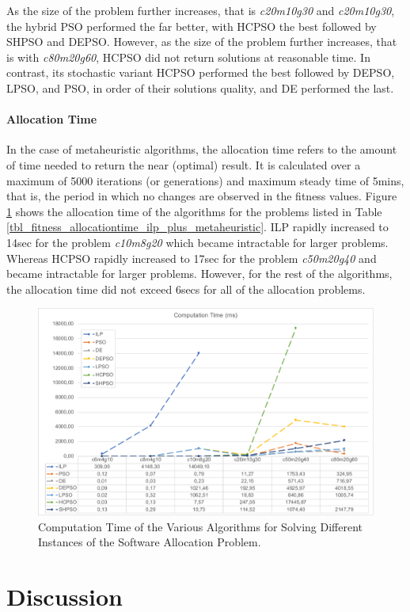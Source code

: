 As the size of the problem further increases, that is \textit{c20m10g30} and \textit{c20m10g30}, the hybrid PSO performed the far better, with HCPSO the best followed by SHPSO and DEPSO. However, as the size of the problem further increases, that is with \textit{c80m20g60}, HCPSO did not return solutions at reasonable time. In contrast, its stochastic variant HCPSO performed the best followed by DEPSO, LPSO, and PSO, in order of their solutions quality, and DE performed the last.

\paragraph{Allocation Time} In the case of metaheuristic algorithms, the allocation time refers to the amount of time needed to return the near (optimal) result. It is calculated over a maximum of 5000 iterations (or generations) and maximum steady time of 5mins, that is, the period in which no changes are observed in the fitness values. Figure \ref{fig_allocationtime_ilp_metaheuristic} shows the allocation time of the algorithms for the problems listed in Table \ref{tbl_fitness_allocationtime_ilp_plus_metaheuristic}. ILP rapidly increased to 14sec for the problem \textit{c10m8g20} which became intractable for larger problems. Whereas HCPSO rapidly increased to 17sec for the problem \textit{c50m20g40} and became intractable for larger problems. However, for the rest of the algorithms, the allocation time did not exceed 6secs for all of the allocation problems.
\begin{figure}[h!]
\centering
\includegraphics[width=1\linewidth]{img/time_summary.pdf}
\caption{Computation Time of the Various Algorithms for Solving Different Instances of the Software Allocation Problem.}
\label{fig_allocationtime_ilp_metaheuristic}\vspace{-0.4cm}
\end{figure}
%


\section{Discussion}
